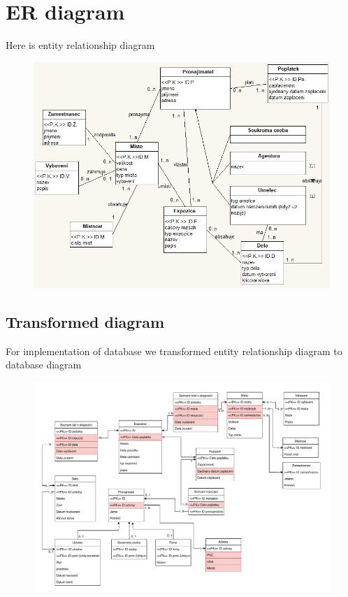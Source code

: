 \documentclass[12pt,a4paper]{article}
\begin{document}
\newpage
\section{ER diagram}

Here is entity relationship diagram
\begin{figure}[h!]
    \centering
    \includegraphics[width=\textwidth,height=\textheight,keepaspectratio]{ER.jpg}
\end{figure}

\newpage
\subsection{Transformed diagram}

For implementation of database we transformed entity relationship diagram to 
database diagram

\begin{figure}[h!]
    \centering
    \includegraphics[width=\textwidth,height=\textheight,keepaspectratio]
    {db_diagram.pdf}
\end{figure}
\end{document}
